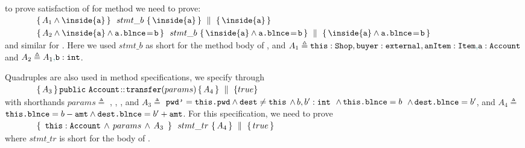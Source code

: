 \Eg to prove satisfaction of  for method  we  need to prove:
\\
$\strut \ \ \ \ \ \ \ \ \ \ \ \quadruple {A_1  \wedge \inside{\prg{a}} } {\ stmt\_b  \ } {\inside{\prg{a}}} { \inside{\prg{a}}} $
\\
$\strut \ \ \ \ \ \  \ \  \ \ \   \quadruple {A_2  \wedge  \inside{\prg{a}} \wedge  \prg{a.\balance}\!=\!{\prg{b}} } {\   stmt\_b  \  } {\inside{\prg{a}} \wedge  \prg{a.\balance}\!=\!\prg{b}}   
                         {  \inside{\prg{a}} \wedge  \prg{a.\balance}\!=\!\prg{b} }$
\\
and similar for . Here we used   $stmt\_b$  as short for the method body of , and $A_1 \triangleq \mbox{\normalfont{\texttt{this}}}:\mbox{\normalfont{\texttt{Shop}}}, \mbox{\normalfont{\texttt{buyer}}}:\mbox{\normalfont{\texttt{external}}}, \mbox{\normalfont{\texttt{anItem}}}:\mbox{\normalfont{\texttt{Item}}}{\color{teal}{,}}\mbox{\normalfont{\texttt{a}}}:\mbox{\normalfont{\texttt{Account}}}$
and $A_2 \triangleq A_1{\color{teal}{,}} \mbox{\normalfont{\texttt{b}}}:\mbox{\normalfont{\texttt{int}}}$.
 
Quadruples are also used in method specifications, \eg we specify  through
\\
$\strut \ \ \ \ \ \  \ \  \ \ \  { \mprepostLongN {A_3}{\prg{public}\ \prg{Account}}{\prg{transfer}}{params}{A_4} {true} }$
\\
with shorthands 
$params \triangleq$ , , , and 
$A_3  \triangleq$  $\mbox{\normalfont{\texttt{pwd'}}}=\mbox{\normalfont{\texttt{this.\mbox{\normalfont{\texttt{pwd}}}}}} \wedge \mbox{\normalfont{\texttt{dest}}}\neq \mbox{\normalfont{\texttt{this}}}$
$\wedge\, b, b':\mbox{\normalfont{\texttt{int}}}$
$\, \wedge\, \mbox{\normalfont{\texttt{this.\mbox{\normalfont{\texttt{blnce}}}}}}=b$ 
$\, \wedge\,  \mbox{\normalfont{\texttt{dest.\mbox{\normalfont{\texttt{blnce}}}}}}=b'$, 
 and $A_4 \triangleq$  
 $\mbox{\normalfont{\texttt{this.\mbox{\normalfont{\texttt{blnce}}}}}}=b-\mbox{\normalfont{\texttt{amt}}} \wedge \mbox{\normalfont{\texttt{dest.\mbox{\normalfont{\texttt{blnce}}}}}}=b'+\mbox{\normalfont{\texttt{amt}}}$.
For this specification, we need to prove\\
$\strut \ \ \ \ \ \ \ \ \ \ \ \quadruple {\ \prg{this}:\prg{Account}\, \wedge\, params\, \wedge\, A_3  \  } {\ stmt\_{tr}  \ } {A_4} { true} $
\\
where $stmt\_{tr}$ is short for the body of  .



